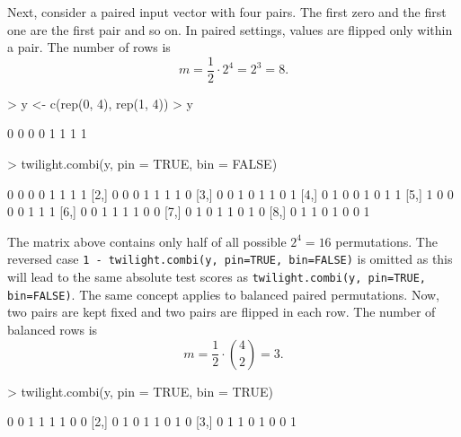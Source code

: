 \documentclass[11pt,a4paper,fleqn]{report}
\newcommand{\Rfunction}[1]{{\texttt{#1}}}
\begin{document}
Next, consider a paired input vector with four pairs. The first zero and the first one are the first pair and so on. In paired settings, values are flipped only within a pair. The number of rows is
\begin{equation}
m = \frac{1}{2} \cdot 2^4 = 2^3 = 8.
\end{equation}
\begin{Schunk}
\begin{Sinput}
> y <- c(rep(0, 4), rep(1, 4))
> y
\end{Sinput}
\begin{Soutput}
[1] 0 0 0 0 1 1 1 1
\end{Soutput}
\end{Schunk}
\begin{Schunk}
\begin{Sinput}
> twilight.combi(y, pin = TRUE, bin = FALSE)
\end{Sinput}
\begin{Soutput}
     [,1] [,2] [,3] [,4] [,5] [,6] [,7] [,8]
[1,]    0    0    0    0    1    1    1    1
[2,]    0    0    0    1    1    1    1    0
[3,]    0    0    1    0    1    1    0    1
[4,]    0    1    0    0    1    0    1    1
[5,]    1    0    0    0    0    1    1    1
[6,]    0    0    1    1    1    1    0    0
[7,]    0    1    0    1    1    0    1    0
[8,]    0    1    1    0    1    0    0    1
\end{Soutput}
\end{Schunk}
The matrix above contains only half of all possible $2^4=16$ permutations. The reversed case \Rfunction{1 - twilight.combi(y, pin=TRUE, bin=FALSE)} is omitted as this will lead to the same absolute test scores as \Rfunction{twilight.combi(y, pin=TRUE, bin=FALSE)}. The same concept applies to balanced paired permutations. Now, two pairs are kept fixed and two pairs are flipped in each row. The number of balanced rows is
\begin{equation}
m = \frac{1}{2} \cdot {4 \choose 2} = 3.
\end{equation}
\begin{Schunk}
\begin{Sinput}
> twilight.combi(y, pin = TRUE, bin = TRUE)
\end{Sinput}
\begin{Soutput}
     [,1] [,2] [,3] [,4] [,5] [,6] [,7] [,8]
[1,]    0    0    1    1    1    1    0    0
[2,]    0    1    0    1    1    0    1    0
[3,]    0    1    1    0    1    0    0    1
\end{Soutput}
\end{Schunk}
\end{document}
